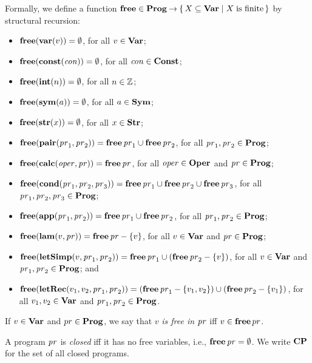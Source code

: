 Formally, we define a function $\free\in\Prog\fun
\index{program!free@$\free$}%
\setof{X\sub\ProgVar}{X\eqtxtl{is finite}}$ by structural recursion:
\begin{itemize}
\item $\mathbf{free}(\mathbf{var}(v)) = \emptyset$, for all $v\in\mathbf{Var}$;

\item $\mathbf{free}(\mathbf{const}(\mathit{con})) = \emptyset$, for all
  $\mathit{con}\in\mathbf{Const}$;

\item $\mathbf{free}(\mathbf{int}(n)) = \emptyset$, for all $n\in\mathbb{Z}$;

\item $\mathbf{free}(\mathbf{sym}(a)) = \emptyset$, for all $a\in\mathbf{Sym}$;

\item $\mathbf{free}(\mathbf{str}(x)) = \emptyset$, for all $x\in\mathbf{Str}$;

\item $\mathbf{free}(\mathbf{pair}(\mathit{pr}_1,\mathit{pr}_2)) = \mathbf{free}\,\mathit{pr}_1\cup\mathbf{free}\,\mathit{pr}_2$,
  for all $\mathit{pr}_1,\mathit{pr}_2\in\mathbf{Prog}$;

\item $\mathbf{free}(\mathbf{calc}(\mathit{oper},\mathit{pr})) = \mathbf{free}\,\mathit{pr}$,
  for all $\mathit{oper}\in\mathbf{Oper}$ and $\mathit{pr}\in\mathbf{Prog}$;

\item $\mathbf{free}(\mathbf{cond}(\mathit{pr}_1,\mathit{pr}_2,\mathit{pr}_3)) =
\mathbf{free}\,\mathit{pr}_1\cup\mathbf{free}\,\mathit{pr}_2\cup\mathbf{free}\,\mathit{pr}_3$,
  for all $\mathit{pr}_1,\mathit{pr}_2,\mathit{pr}_3\in\mathbf{Prog}$;

\item $\mathbf{free}(\mathbf{app}(\mathit{pr}_1,\mathit{pr}_2)) = \mathbf{free}\,\mathit{pr}_1\cup\mathbf{free}\,\mathit{pr}_2$,
  for all $\mathit{pr}_1,\mathit{pr}_2\in\mathbf{Prog}$;

\item $\mathbf{free}(\mathbf{lam}(v,\mathit{pr})) = \mathbf{free}\,\mathit{pr} - \{v\}$,
  for all $v\in\mathbf{Var}$ and $\mathit{pr}\in\mathbf{Prog}$;

\item $\mathbf{free}(\mathbf{letSimp}(v,\mathit{pr}_1,\mathit{pr}_2)) =
  \mathbf{free}\,\mathit{pr}_1\cup(\mathbf{free}\,\mathit{pr}_2 - \{v\})$,
  for all $v\in\mathbf{Var}$ and $\mathit{pr}_1,\mathit{pr}_2\in\mathbf{Prog}$; and

\item $\mathbf{free}(\mathbf{letRec}(v_1,v_2,\mathit{pr}_1,\mathit{pr}_2)) =
  (\mathbf{free}\,\mathit{pr}_1 - \{v_1,v_2\})\cup (\mathbf{free}\,\mathit{pr}_2 - \{v_1\})$,
  for all $v_1,v_2\in\mathbf{Var}$ and $\mathit{pr}_1,\mathit{pr}_2\in\mathbf{Prog}$.
\end{itemize}
If $v\in\mathbf{Var}$ and $pr\in\mathbf{Prog}$, we say that $v$ \emph{is free in}
$\mathit{pr}$ iff $v\in\mathbf{free}\,pr$.

%
%
A program $\mathit{pr}$ is \emph{closed} iff it has no free variables, i.e.,
$\mathbf{free}\,\mathit{pr} = \emptyset$.  We write $\mathbf{CP}$ for the set of all closed
programs.

